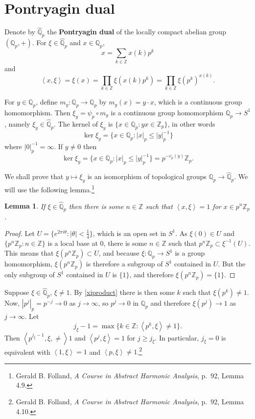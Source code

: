 \documentclass{article}
\newcommand{\inner}[2]{\left\langle #1, #2 \right\rangle}
\newtheorem{lemma}[theorem]{Lemma}
\theoremstyle{definition}
\begin{document}
\section{Pontryagin dual}
Denote by $\widehat{\mathbb{Q}}_p$ the \textbf{Pontryagin dual} of the locally compact abelian group
$(\mathbb{Q}_p,+)$. 
For $\xi \in \widehat{\mathbb{Q}}_p$ and $x \in \mathbb{Q}_p$,
\[
x = \sum_{k \in \mathbb{Z}} x(k) p^k
\]
and
\begin{equation}
\inner{x}{\xi} = \xi(x) = \prod_{k \in \mathbb{Z}} \xi(x(k) p^k) = \prod_{k \in \mathbb{Z}}  \xi(p^k)^{x(k)}.
\label{xiproduct}
\end{equation}

For $y \in \mathbb{Q}_p$, define $m_y:\mathbb{Q}_p \to \mathbb{Q}_p$ by
$m_y(x)=y\cdot x$, which is a continuous group homomorphism. Then
$\xi_y = \psi_p \circ m_y$ is a continuous group homomorphism $\mathbb{Q}_p \to S^1$, namely
$\xi_y \in \widehat{\mathbb{Q}}_p$. The kernel
of $\xi_y$ is $\{x \in \mathbb{Q}_p : yx \in \mathbb{Z}_p\}$, in other words
\[
\ker \xi_y = \{x \in \mathbb{Q}_p : |x|_p \leq |y|_p^{-1}\} 
\]
where $|0|_p^{-1} = \infty$. If $y \neq 0$ then
\[
\ker \xi_y = \{x \in \mathbb{Q}_p : |x|_p \leq |y|_p^{-1}\}  = p^{-v_p(y)} \mathbb{Z}_p.
\]

We shall prove that $y \mapsto \xi_y$ is an isomorphism of topological groups
$\mathbb{Q}_p \to \widehat{\mathbb{Q}}_p$. We will use the following lemma.\footnote{Gerald B. Folland, {\em A Course in Abstract Harmonic
Analysis}, p.~92, Lemma 4.9.}

\begin{lemma}
If $\xi \in \widehat{\mathbb{Q}}_p$ then there is some $n \in \mathbb{Z}$ such that
$\inner{x}{\xi}=1$ for $x \in p^n \mathbb{Z}_p$. 
\label{lemma49}
\end{lemma}
\begin{proof}
Let $U=\{e^{2\pi i\theta}: |\theta|<\frac{1}{4}\}$, which is an open set in $S^1$.
As
$\xi(0) \in U$ and $\{p^n \mathbb{Z}_p: n \in \mathbb{Z}\}$ is a local base at $0$, 
there is some $n \in \mathbb{Z}$ such that
$p^n \mathbb{Z}_p \subset \xi^{-1}(U)$. This means that 
$\xi(p^n \mathbb{Z}_p) \subset U$, and because $\xi:\mathbb{Q}_p \to S^1$ is a group homomorphism,
$\xi(p^n \mathbb{Z}_p)$ is therefore a subgroup of $S^1$ contained in $U$.
But the only subgroup of $S^1$ contained in $U$ is $\{1\}$, and therefore
$\xi(p^n \mathbb{Z}_p) = \{1\}$.
\end{proof}

Suppose $\xi \in \widehat{\mathbb{Q}}_p$, $\xi \neq 1$. 
By \eqref{xiproduct} there is then some $k$ such that $\xi(p^k) \neq 1$. Now,
$|p^j|_p = p^{-j} \to 0$ as $j \to \infty$, so $p^j \to 0$ in $\mathbb{Q}_p$  and therefore
$\xi(p^j) \to 1$ as $j \to \infty$. Let
\[
j_\xi-1 = \max\{k \in \mathbb{Z} : \inner{p^k}{\xi} \neq 1\}.
\]
Then $\inner{p^{j_\xi-1},\xi} \neq 1$ and $\inner{p^j}{\xi}=1$ for $j \geq j_\xi$.
In particular, $j_\xi=0$ is equivalent with
 $\inner{1}{\xi}=1$ and $\inner{p}{\xi}\neq 1$.\footnote{Gerald B. Folland, {\em A Course in Abstract Harmonic
Analysis}, p.~92, Lemma 4.10.}
\end{document}
